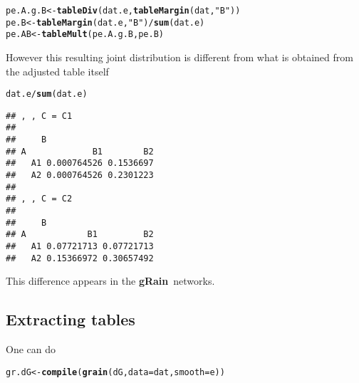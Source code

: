 \documentclass[10pt]{article}\usepackage[]{graphicx}\usepackage[]{color}
\makeatletter
\newcommand{\hlstr}[1]{\textcolor[rgb]{0.192,0.494,0.8}{#1}}%
\newcommand{\hlopt}[1]{\textcolor[rgb]{0,0,0}{#1}}%
\newcommand{\hlstd}[1]{\textcolor[rgb]{0.345,0.345,0.345}{#1}}%
\newcommand{\hlkwb}[1]{\textcolor[rgb]{0.69,0.353,0.396}{#1}}%
\newcommand{\hlkwc}[1]{\textcolor[rgb]{0.333,0.667,0.333}{#1}}%
\newcommand{\hlkwd}[1]{\textcolor[rgb]{0.737,0.353,0.396}{\textbf{#1}}}%
\newenvironment{kframe}{%
 \def\at@end@of@kframe{}%
 \ifinner\ifhmode%
  \def\at@end@of@kframe{\end{minipage}}%
  \begin{minipage}{\columnwidth}%
 \fi\fi%
 \def\FrameCommand##1{\hskip\@totalleftmargin \hskip-\fboxsep
 \colorbox{shadecolor}{##1}\hskip-\fboxsep
     \hskip-\linewidth \hskip-\@totalleftmargin \hskip\columnwidth}%
 \MakeFramed {\advance\hsize-\width
   \@totalleftmargin\z@ \linewidth\hsize
   \@setminipage}}%
 {\par\unskip\endMakeFramed%
 \at@end@of@kframe}
\newenvironment{knitrout}{}{} %
\def\grbn{{\bf gRain}}
\makeatother
\begin{document}
\begin{knitrout}
\color{fgcolor}\begin{kframe}
\begin{alltt}
\hlstd{pe.A.g.B} \hlkwb{<-} \hlkwd{tableDiv}\hlstd{(dat.e,} \hlkwd{tableMargin}\hlstd{(dat,} \hlstr{"B"}\hlstd{))}
\hlstd{pe.B} \hlkwb{<-} \hlkwd{tableMargin}\hlstd{(dat.e,} \hlstr{"B"}\hlstd{)}\hlopt{/}\hlkwd{sum}\hlstd{(dat.e)}
\hlstd{pe.AB}  \hlkwb{<-} \hlkwd{tableMult}\hlstd{( pe.A.g.B, pe.B )}
\end{alltt}
\end{kframe}
\end{knitrout}

However this resulting joint distribution is different from what is
obtained from the adjusted table itself
\begin{knitrout}
\color{fgcolor}\begin{kframe}
\begin{alltt}
\hlstd{dat.e} \hlopt{/} \hlkwd{sum}\hlstd{(dat.e)}
\end{alltt}
\begin{verbatim}
## , , C = C1
## 
##     B
## A             B1        B2
##   A1 0.000764526 0.1536697
##   A2 0.000764526 0.2301223
## 
## , , C = C2
## 
##     B
## A            B1         B2
##   A1 0.07721713 0.07721713
##   A2 0.15366972 0.30657492
\end{verbatim}
\end{kframe}
\end{knitrout}

This difference appears in the \grbn\ networks.

\subsection{Extracting tables}
\label{sec:extracting-tables}

One can do
\begin{knitrout}
\color{fgcolor}\begin{kframe}
\begin{alltt}
\hlstd{gr.dG} \hlkwb{<-} \hlkwd{compile}\hlstd{(}\hlkwd{grain}\hlstd{(dG,} \hlkwc{data}\hlstd{=dat,} \hlkwc{smooth}\hlstd{=e))}
\end{alltt}
\end{kframe}
\end{knitrout}
\end{document}
